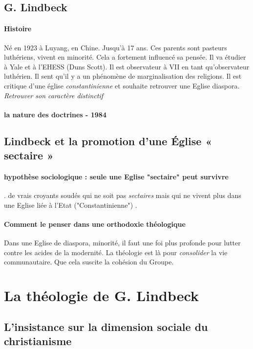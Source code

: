 \subsection{G. Lindbeck}

\paragraph{Histoire} Né en 1923 à Luyang, en Chine. Jusqu'à 17 ans. Ces parents sont pasteurs luthériens, vivent en minorité. Cela a fortement influencé sa pensée. Il va étudier à Yale et à l'EHESS (Duns Scott). Il est observateur à VII en tant qu'observateur luthérien. Il sent qu'il y a un phénomène de marginalisation des religions. Il est critique d'une église \textit{constantinienne} et souhaite retrouver une Eglise diaspora. \textit{Retrouver son caractère distinctif}
\paragraph{la nature des doctrines - 1984}
\subsection{Lindbeck et la promotion d’une Église « sectaire »}

\paragraph{hypothèse sociologique : seule une Eglise "sectaire" peut survivre}. de vrais croyants soudés qui ne soit pas \textit{sectaires} mais qui ne vivent plus dans une Eglise liée à l'Etat ("Constantinienne")
. 

\paragraph{Comment le penser dans une orthodoxie théologique} Dans une Eglise de diaspora, minorité, il faut une foi plus profonde pour lutter contre les acides de la modernité.  La théologie est là pour \textit{consolider} la vie communautaire. Que cela suscite la cohésion du Groupe.

\section{La théologie de G. Lindbeck}
 \subsection{L’insistance sur la dimension sociale du christianisme}

